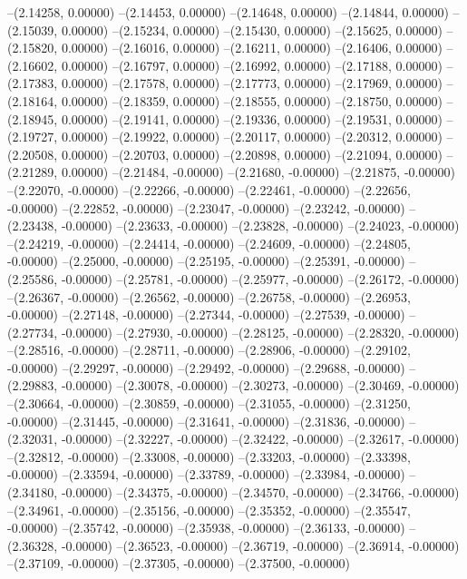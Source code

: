 --(2.14258, 0.00000)
--(2.14453, 0.00000)
--(2.14648, 0.00000)
--(2.14844, 0.00000)
--(2.15039, 0.00000)
--(2.15234, 0.00000)
--(2.15430, 0.00000)
--(2.15625, 0.00000)
--(2.15820, 0.00000)
--(2.16016, 0.00000)
--(2.16211, 0.00000)
--(2.16406, 0.00000)
--(2.16602, 0.00000)
--(2.16797, 0.00000)
--(2.16992, 0.00000)
--(2.17188, 0.00000)
--(2.17383, 0.00000)
--(2.17578, 0.00000)
--(2.17773, 0.00000)
--(2.17969, 0.00000)
--(2.18164, 0.00000)
--(2.18359, 0.00000)
--(2.18555, 0.00000)
--(2.18750, 0.00000)
--(2.18945, 0.00000)
--(2.19141, 0.00000)
--(2.19336, 0.00000)
--(2.19531, 0.00000)
--(2.19727, 0.00000)
--(2.19922, 0.00000)
--(2.20117, 0.00000)
--(2.20312, 0.00000)
--(2.20508, 0.00000)
--(2.20703, 0.00000)
--(2.20898, 0.00000)
--(2.21094, 0.00000)
--(2.21289, 0.00000)
--(2.21484, -0.00000)
--(2.21680, -0.00000)
--(2.21875, -0.00000)
--(2.22070, -0.00000)
--(2.22266, -0.00000)
--(2.22461, -0.00000)
--(2.22656, -0.00000)
--(2.22852, -0.00000)
--(2.23047, -0.00000)
--(2.23242, -0.00000)
--(2.23438, -0.00000)
--(2.23633, -0.00000)
--(2.23828, -0.00000)
--(2.24023, -0.00000)
--(2.24219, -0.00000)
--(2.24414, -0.00000)
--(2.24609, -0.00000)
--(2.24805, -0.00000)
--(2.25000, -0.00000)
--(2.25195, -0.00000)
--(2.25391, -0.00000)
--(2.25586, -0.00000)
--(2.25781, -0.00000)
--(2.25977, -0.00000)
--(2.26172, -0.00000)
--(2.26367, -0.00000)
--(2.26562, -0.00000)
--(2.26758, -0.00000)
--(2.26953, -0.00000)
--(2.27148, -0.00000)
--(2.27344, -0.00000)
--(2.27539, -0.00000)
--(2.27734, -0.00000)
--(2.27930, -0.00000)
--(2.28125, -0.00000)
--(2.28320, -0.00000)
--(2.28516, -0.00000)
--(2.28711, -0.00000)
--(2.28906, -0.00000)
--(2.29102, -0.00000)
--(2.29297, -0.00000)
--(2.29492, -0.00000)
--(2.29688, -0.00000)
--(2.29883, -0.00000)
--(2.30078, -0.00000)
--(2.30273, -0.00000)
--(2.30469, -0.00000)
--(2.30664, -0.00000)
--(2.30859, -0.00000)
--(2.31055, -0.00000)
--(2.31250, -0.00000)
--(2.31445, -0.00000)
--(2.31641, -0.00000)
--(2.31836, -0.00000)
--(2.32031, -0.00000)
--(2.32227, -0.00000)
--(2.32422, -0.00000)
--(2.32617, -0.00000)
--(2.32812, -0.00000)
--(2.33008, -0.00000)
--(2.33203, -0.00000)
--(2.33398, -0.00000)
--(2.33594, -0.00000)
--(2.33789, -0.00000)
--(2.33984, -0.00000)
--(2.34180, -0.00000)
--(2.34375, -0.00000)
--(2.34570, -0.00000)
--(2.34766, -0.00000)
--(2.34961, -0.00000)
--(2.35156, -0.00000)
--(2.35352, -0.00000)
--(2.35547, -0.00000)
--(2.35742, -0.00000)
--(2.35938, -0.00000)
--(2.36133, -0.00000)
--(2.36328, -0.00000)
--(2.36523, -0.00000)
--(2.36719, -0.00000)
--(2.36914, -0.00000)
--(2.37109, -0.00000)
--(2.37305, -0.00000)
--(2.37500, -0.00000)
